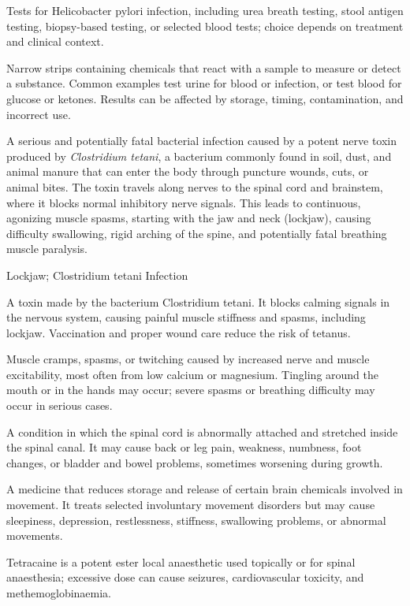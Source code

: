  Tests for Helicobacter pylori infection, including urea breath testing, stool antigen testing, biopsy-based testing, or selected blood tests; choice depends on treatment and clinical context.

 Narrow strips containing chemicals that react with a sample to measure or detect a substance. Common examples test urine for blood or infection, or test blood for glucose or ketones. Results can be affected by storage, timing, contamination, and incorrect use.

 A serious and potentially fatal bacterial infection caused by a potent nerve toxin produced by \textit{Clostridium tetani}, a bacterium commonly found in soil, dust, and animal manure that can enter the body through puncture wounds, cuts, or animal bites. The toxin travels along nerves to the spinal cord and brainstem, where it blocks normal inhibitory nerve signals. This leads to continuous, agonizing muscle spasms, starting with the jaw and neck (lockjaw), causing difficulty swallowing, rigid arching of the spine, and potentially fatal breathing muscle paralysis.

\synonyms
Lockjaw; Clostridium tetani Infection

 A toxin made by the bacterium Clostridium tetani. It blocks calming signals in the nervous system, causing painful muscle stiffness and spasms, including lockjaw. Vaccination and proper wound care reduce the risk of tetanus.

 Muscle cramps, spasms, or twitching caused by increased nerve and muscle excitability, most often from low calcium or magnesium. Tingling around the mouth or in the hands may occur; severe spasms or breathing difficulty may occur in serious cases.

 A condition in which the spinal cord is abnormally attached and stretched inside the spinal canal. It may cause back or leg pain, weakness, numbness, foot changes, or bladder and bowel problems, sometimes worsening during growth.

 A medicine that reduces storage and release of certain brain chemicals involved in movement. It treats selected involuntary movement disorders but may cause sleepiness, depression, restlessness, stiffness, swallowing problems, or abnormal movements.

 Tetracaine is a potent ester local anaesthetic used topically or for spinal anaesthesia; excessive dose can cause seizures, cardiovascular toxicity, and methemoglobinaemia.

